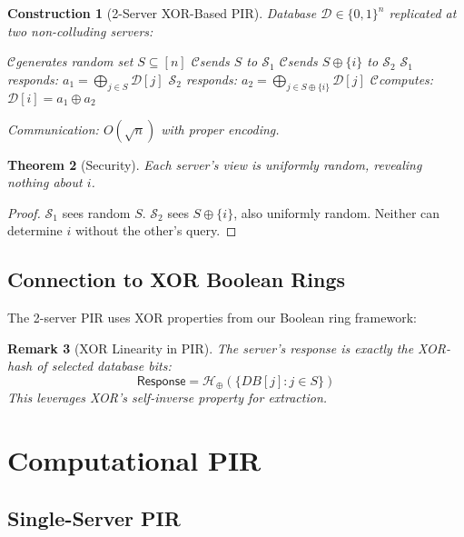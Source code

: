 \documentclass[11pt,final,hidelinks]{article}
\newcommand{\DB}{\mathcal{D}}
\newcommand{\Response}{\mathsf{Response}}
\newcommand{\Server}{\ensuremath{\mathcal{S}}}
\newcommand{\Client}{\ensuremath{\mathcal{C}}}
\newcommand{\XOR}{\oplus}
\newcommand{\HashXOR}[1]{\mathcal{H}_{\XOR}(#1)}
\newtheorem{theorem}{Theorem}[section]
\newtheorem{remark}[theorem]{Remark}
\newtheorem{construction}[theorem]{Construction}
\begin{document}
\begin{construction}[2-Server XOR-Based PIR]
Database $\DB \in \{0,1\}^n$ replicated at two non-colluding servers:
\begin{algorithm}[H]
\caption{2-Server PIR Protocol}
\KwOut{Bit $\DB[i]$}
\Client generates random set $S \subseteq [n]$\;
\Client sends $S$ to $\Server_1$\;
\Client sends $S \oplus \{i\}$ to $\Server_2$\;
$\Server_1$ responds: $a_1 = \bigoplus_{j \in S} \DB[j]$\;
$\Server_2$ responds: $a_2 = \bigoplus_{j \in S \oplus \{i\}} \DB[j]$\;
\Client computes: $\DB[i] = a_1 \oplus a_2$\;
\end{algorithm}
Communication: $O(\sqrt{n})$ with proper encoding.
\end{construction}

\begin{theorem}[Security]
Each server's view is uniformly random, revealing nothing about $i$.
\end{theorem}

\begin{proof}
$\Server_1$ sees random $S$. $\Server_2$ sees $S \oplus \{i\}$, also uniformly random.
Neither can determine $i$ without the other's query.
\end{proof}

\subsection{Connection to XOR Boolean Rings}

The 2-server PIR uses XOR properties from our Boolean ring framework:

\begin{remark}[XOR Linearity in PIR]
The server's response is exactly the XOR-hash of selected database bits:
\begin{equation}
\Response = \HashXOR{\{DB[j] : j \in S\}}
\end{equation}
This leverages XOR's self-inverse property for extraction.
\end{remark}

\section{Computational PIR}

\subsection{Single-Server PIR}
\end{document}
